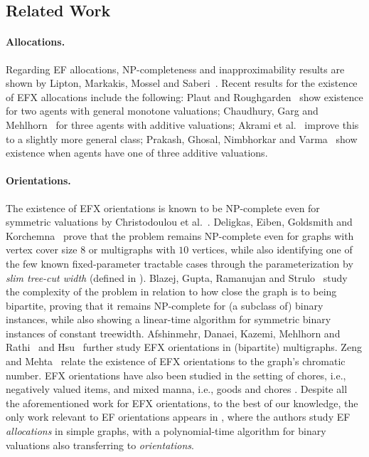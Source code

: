 \documentclass[11pt,letterpaper]{article}
\begin{document}
\subsection{Related Work}

\paragraph{Allocations.} Regarding EF allocations, NP-completeness and inapproximability results are shown by Lipton, Markakis, Mossel and Saberi~\cite{LiptonEtAl}.
Recent results for the existence of EFX allocations include the following: Plaut and Roughgarden~\cite{PlautRough} show existence for two agents with general monotone valuations; Chaudhury, Garg and Mehlhorn~\cite{CGM24} for three agents with additive valuations; Akrami et al.~\cite{akrami2022efxallocationssimplificationsimprovements} improve this to a slightly more general class; Prakash, Ghosal, Nimbhorkar and Varma~\cite{efxexistsfor3typesofadditiveagents} show existence when agents have one of three additive valuations.



\paragraph{Orientations.}
The existence of EFX orientations is known to be NP-complete even for symmetric valuations by Christodoulou et al.~\cite{EFXgraphs}.
Deligkas, Eiben, Goldsmith and Korchemna~\cite{ijcai/DeligkasEGK25} prove that the problem remains NP-complete even for graphs with vertex cover size $8$ or multigraphs with $10$ vertices, while also identifying one of the few known fixed-parameter tractable cases through the parameterization by \emph{slim tree-cut width} (defined in \cite{algorithmica/GanianK24}).
Blazej, Gupta, Ramanujan and Strulo~\cite{sagt/BlazejGRS25} study the complexity of the problem in relation to how close the graph is to being bipartite,
proving that it remains NP-complete for (a subclass of) binary instances,
while also showing a linear-time algorithm for symmetric binary instances of constant treewidth.
Afshinmehr, Danaei, Kazemi, Mehlhorn and Rathi~\cite{AfshinmehrDKMR25} and Hsu~\cite{ecai/Hsu25} further study EFX orientations in (bipartite) multigraphs. %
Zeng and Mehta~\cite{ifaamas/ZengM25} relate the existence of EFX orientations to the graph's chromatic number.
EFX orientations have also been studied in the setting of chores, i.e., negatively valued items, and mixed manna, i.e., goods and chores \cite{hsu2025polynomialtimealgorithmefxorientationsChores,ijcai/ZWL024}.
Despite all the aforementioned work for EFX orientations, to the best of our knowledge,
the only work relevant to EF orientations appears in \cite{aldt/MisraS24},
where the authors study EF \emph{allocations} in simple graphs,
with a polynomial-time algorithm for binary valuations also transferring to \emph{orientations}.
\end{document}

